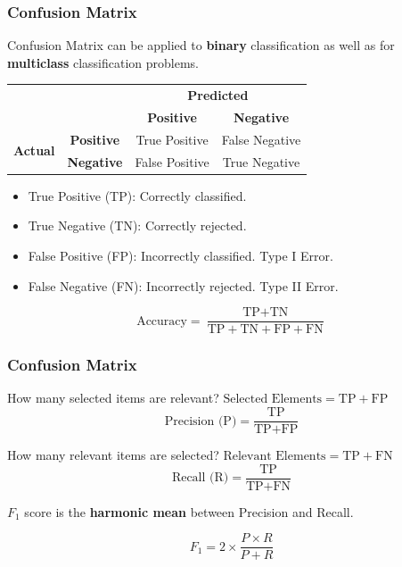 \documentclass[aspectratio=169, 10pt]{beamer}
\begin{document}
\begin{frame}
    \frametitle{Confusion Matrix}
    
    Confusion Matrix can be applied to \textbf{binary} classification as well as for \textbf{multiclass} classification problems.
            
    \begin{table}[]
        \begin{tabular}{cccc}
                                         &                                        & \multicolumn{2}{c}{\textbf{Predicted}}                                    \\
                                         &                                        & \textbf{Positive}                   & \textbf{Negative}                   \\ \cline{3-4} 
        \multirow{2}{*}{\textbf{Actual}} & \multicolumn{1}{c|}{\textbf{Positive}} & \multicolumn{1}{c|}{\cellcolor{blue!25}True Positive}  & \multicolumn{1}{c|}{\cellcolor{red!25}False Negative} \\ \cline{3-4} 
                                         & \multicolumn{1}{c|}{\textbf{Negative}} & \multicolumn{1}{c|}{\cellcolor{red!25}False Positive} & \multicolumn{1}{c|}{\cellcolor{blue!25}True Negative}  \\ \cline{3-4} 
        \end{tabular}
    \end{table}

    \begin{itemize}
        \item True Positive (TP): Correctly classified.
        \item True Negative (TN): Correctly rejected.
        \item False Positive (FP): Incorrectly classified. Type I Error.
        \item False Negative (FN): Incorrectly rejected. Type II Error.
    \end{itemize}

    \[
        \text{Accuracy} = \frac{\text{TP} + \text{TN}}{\text{TP} + \text{TN} + \text{FP} + \text{FN}}
    \]

\end{frame}

\begin{frame}
    \frametitle{Confusion Matrix}

    How many selected items are relevant? $\text{Selected Elements} = \text{TP}+ \text{FP}$
    \[
        \text{Precision (P)} = \frac{\text{TP}}{\text{TP}+ \text{FP}}
    \]

    How many relevant items are selected? $\text{Relevant Elements} = \text{TP}+ \text{FN}$
    \[
        \text{Recall (R)} = \frac{\text{TP}}{\text{TP}+ \text{FN}}
    \]
    
    $F_1$ score is the \textbf{harmonic mean} between Precision and Recall.

    \[
        F_1 = 2 \times \frac{P \times R}{P + R}
    \]
    
\end{frame}
\end{document}
